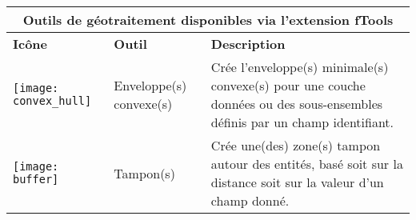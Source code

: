 \begin{table}[ht]
\centering

\begin{tabular}{|m{1cm}|m{3cm}|m{9cm}|}
 \hline \multicolumn{3}{|c|}{\textbf{Outils de géotraitement disponibles via l'extension fTools}} \\
 \hline \textbf{Icône} & \textbf{Outil} & \textbf{Description} \\
 \hline \texttt{[image: convex\_hull]} & Enveloppe(s) convexe(s) & Crée l'enveloppe(s) minimale(s) convexe(s) pour une couche données ou des sous-ensembles définis par un champ identifiant. \\
 \hline \texttt{[image: buffer]} & Tampon(s) & Crée une(des) zone(s) tampon autour des entités, basé soit sur la distance soit sur la valeur d'un champ donné. \\

\end{tabular}
\end{table}
